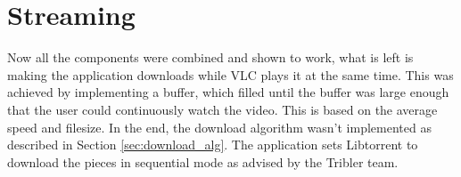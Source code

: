 \section{Streaming}
\thispagestyle{fancy}
Now all the components were combined and shown to work, what is left is making the application downloads while VLC plays it at the same time. This was achieved by implementing a buffer, which filled until the buffer was large enough that the user could continuously watch the video. This is based on the average speed and filesize. In the end, the download algorithm wasn't implemented as described in Section \ref{sec:download_alg}. The application sets Libtorrent to download the pieces in sequential mode as advised by the Tribler team. 